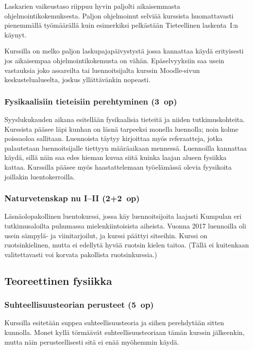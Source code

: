 \documentclass[../ala_hataile.tex]{subfiles}
\begin{document}
	Laskarien vaikeustaso riippuu hyvin
	paljolti aikaisemmasta ohjelmointi\-kokemuksesta.
	Paljon ohjelmoinut selviää
	kurssista huomattavasti pienemmällä työmäärällä
	kuin esimerkiksi pelkästään Tieteellinen
	laskenta~I:n käynyt.
	
	Kurssilla on melko paljon lasku\-paja\-päivystystä
	jossa kannattaa käydä erityisesti
	jos aikaisempaa ohjelmointi\-kokemusta
	on vähän. Epä\-selvyyksiin saa usein
	vastauksia joko assareilta tai luennoitsijalta
	kurssin Moodle-sivun keskustelu\-alueelta,
	joskus yllättävänkin nopeasti.
	
	\subsubsection*{Fysikaalisiin tieteisiin perehtyminen (3~op)}
	Syys\-lukukauden aikana esitellään fysikaalisia
	tieteitä ja niiden tutkimus\-kohteita.
	Kurssista pääsee läpi kunhan on läsnä
	tarpeeksi monella luennolla; noin kolme
	poissa\-oloa sallitaan. Luennoista täytyy kirjoittaa
	myös referaatteja, jotka palautetaan
	luennoitsijalle tiettyyn määrä\-aikaan
	mennessä. Luennoilla kannattaa käydä, sillä
	näin saa edes hieman kuvaa siitä kuinka
	laajan alueen fysiikka kattaa. Kurssilla pääsee myös haastattelemaan työelämässä olevia fyysikoita joillakin luento\-kerroilla. 
	
	\subsubsection*{Naturvetenskap nu I--II (2+2~op)}
	Läsnäolopakollinen luento\-kurssi, jossa käy luennoitsijoita laajasti Kumpulan eri tutkimusaloilta puhumassa mielenkiintoisista aiheista. Vuonna 2017 luennoilla oli usein sämpylä- ja viini\-tarjoilut, ja kurssi päättyi sitseihin. Kurssi on ruotsinkielinen, mutta ei edellytä hyvää ruotsin kielen taitoa. (Tällä ei kuitenkaan valitettavasti voi korvata pakollista ruotsinkurssia.)
	
	\subsection*{Teoreettinen fysiikka}
	\subsubsection*{Suhteellisuusteorian perusteet (5~op)}
	Kurssilla esitetään suppea suhteellisuus\-teoria
	ja siihen perehdytään sitten kunnolla.
	Monet kyllä törmäävät suhteellisuus\-teoriaan
	tämän kurssin jälkeenkin, mutta näin
	perusteellisesti sitä ei enää myöhemmin
	käydä.
	
\end{document}
